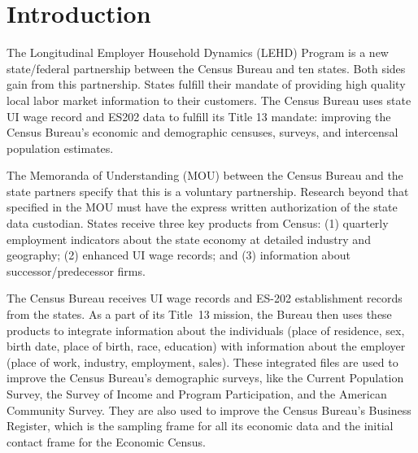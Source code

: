                       


%
%

\section{Introduction}
\label{sec:intro}

The Longitudinal Employer Household Dynamics (LEHD) Program is a new 
state/federal partnership between the Census Bureau and ten states. Both 
sides gain from this partnership. States fulfill their mandate of providing 
high quality local labor market information to their customers. The Census 
Bureau uses state UI wage record and ES202 data to fulfill its Title 13 
mandate: improving the Census Bureau's economic and demographic censuses, 
surveys, and intercensal population estimates.





The Memoranda of Understanding (MOU) between the Census Bureau and the state 
partners specify that this is a voluntary partnership. Research beyond that 
specified in the MOU must have the express written authorization of the 
state data custodian. States receive three key products from Census: (1) 
quarterly employment indicators about the state economy at detailed industry 
and geography; (2) enhanced UI wage records; and (3) information about 
successor/predecessor firms.





The Census Bureau receives UI wage records and ES-202 establishment records
from the states. As a part of its Title~13 mission, the Bureau then uses
these products to integrate information about the individuals (place of
residence, sex, birth date, place of birth, race, education) with
information about the employer (place of work, industry, employment,
sales).  These integrated files are used to improve the Census Bureau's
demographic surveys, like the Current Population Survey, the Survey of
Income and Program Participation, and the American Community Survey. They
are also used to improve the Census Bureau's Business Register, which is
the sampling frame for all its economic data and the initial contact frame
for the Economic Census.





